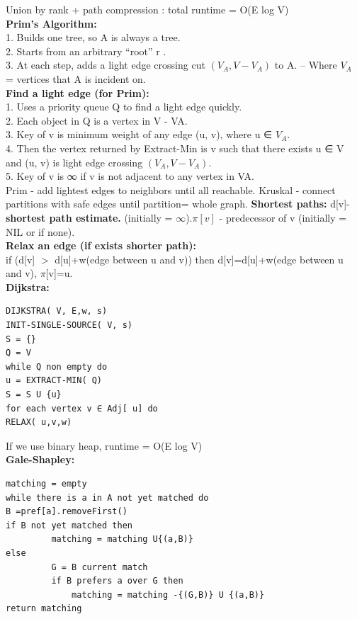 \documentclass[paper=a4, fontsize=11pt]{scrartcl} %
\begin{document}
Union by rank + path compression : total runtime = O(E log V)\\
\textbf{Prim's Algorithm: }\\
1. Builds	 one	tree,	so	 A	 is	always	a	tree.	\\
2. Starts	from	an	arbitrary	 “root” r	 .	\\
3. At	each	step,	 adds	a	light	edge	 crossing	cut	 $(V_A, V	 - V_A)$ to A.
– Where	 $V_A$ = vertices	that	 A	 is	incident	on.\\
\textbf{Find a light edge (for Prim):}\\
1. Uses	a	 priority	queue	 Q	to	find	a		light	edge	quickly.\\	
2. Each	object	in	 Q	 is	a	vertex	in	V - VA.	\\
3. Key	of	 v is	minimum	weight	of	any	edge	 (u, v),	where	 u	 ∈ $V_A$.	\\
4. Then	the	vertex	returned	by	Extract-Min	is	 v such	that	there	
exists	 u	 ∈ V  and	 (u, v) is	light	edge	crossing	 $(V_A, V - V_A)$.	\\
5. Key	of	 v is	 ∞ if	 v is	not	adjacent	to	any	vertex	in	VA.\\
Prim - add lightest edges to neighbors until all reachable. Kruskal - connect partitions with safe edges until partition= whole graph.
\textbf{Shortest paths:} d[v]- \textbf{shortest path estimate.} (initially = $\infty$).$\pi[v]$ - predecessor of v (initially = NIL or if none).\\
\textbf{Relax an edge (if exists shorter path):}\\
if (d[v] $>$ d[u]+w(edge between u and v)) then d[v]=d[u]+w(edge between u and v), $\pi$[v]=u.\\
\textbf{Dijkstra: }\\
\begin{lstlisting}[frame=single]
DIJKSTRA( V, E,w, s)
INIT-SINGLE-SOURCE( V, s)
S = {}
Q = V
while Q non empty do
u = EXTRACT-MIN( Q)
S = S U {u}
for each vertex v ∈ Adj[ u] do
RELAX( u,v,w)
\end{lstlisting}
If we use binary heap, runtime = O(E log V)\\
\textbf{Gale-Shapley:} \\
\begin{lstlisting}[frame=single]
matching = empty
while there is a in A not yet matched do	
B =pref[a].removeFirst()	
if B not yet matched then
	 	 matching = matching U{(a,B)}	
else	
	 	 G = B current match 	
	 	 if B prefers a over G then
	 	 	 matching = matching -{(G,B)} U {(a,B)}
return matching
\end{lstlisting}
\end{document}
